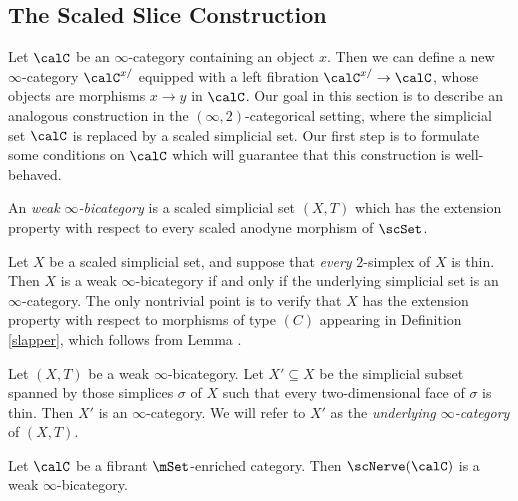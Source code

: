\subsection{The Scaled Slice Construction}\label{bisec4.1}

Let $\calC$ be an $\infty$-category containing an object $x$. Then we can define
a new $\infty$-category $\calC^{x/}$ equipped with a left fibration
$\calC^{x/} \rightarrow \calC$, whose objects are morphisms
$x \rightarrow y$ in $\calC$. Our goal in this section is to describe
an analogous construction in the $(\infty,2)$-categorical setting,
where the simplicial set $\calC$ is replaced by a scaled simplicial set.
Our first step is to formulate some conditions on $\calC$ which will guarantee
that this construction is well-behaved.

\begin{definition}
An {\it weak $\infty$-bicategory} is a scaled simplicial set $(X,T)$ which has the
extension property with respect to every scaled anodyne morphism of $\scSet$.
\end{definition}

\begin{remark}
Let $X$ be a scaled simplicial set, and suppose that {\em every} $2$-simplex of $X$ is thin.
Then $X$ is a weak $\infty$-bicategory if and only if the underlying simplicial set is an $\infty$-category.
The only nontrivial point is to verify that $X$ has the extension property with respect to morphisms of type $(C)$ appearing in Definition \ref{slapper}, which follows from Lemma .
\end{remark}

\begin{remark}\label{copus}
Let $(X,T)$ be a weak $\infty$-bicategory. Let $X' \subseteq X$ be the simplicial subset spanned
by those simplices $\sigma$ of $X$ such that every two-dimensional face of $\sigma$ is thin.
Then $X'$ is an $\infty$-category. We will refer to $X'$ as the {\em underlying $\infty$-category}
of $(X,T)$.
\end{remark}

\begin{example}
Let $\calC$ be a fibrant $\mSet$-enriched category. Then $\scNerve(\calC)$ is a weak
$\infty$-bicategory.
\end{example}

